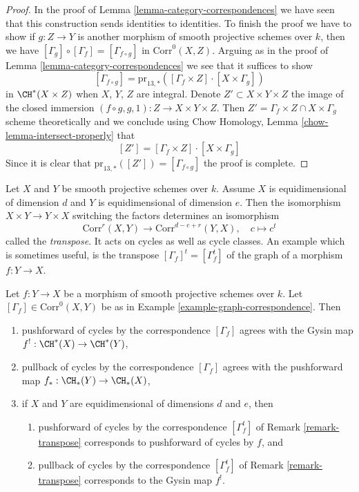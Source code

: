 \begin{proof}
In the proof of Lemma \ref{lemma-category-correspondences}
we have seen that this construction sends identities to
identities. To finish the proof we have to show if $g : Z \to Y$
is another morphism of smooth projective schemes over $k$, then we have
$[\Gamma_g] \circ [\Gamma_f] = [\Gamma_{f \circ g}]$ in
$\text{Corr}^0(X, Z)$. Arguing as in the proof of
Lemma \ref{lemma-category-correspondences} we see that it
suffices to show
$$
[\Gamma_{f \circ g}] =
\text{pr}_{13, *}([\Gamma_f \times Z] \cdot [X \times \Gamma_g])
$$
in $\CH^*(X \times Z)$ when $X$, $Y$, $Z$ are integral.
Denote $Z' \subset X \times Y \times Z$ the image of the closed immersion
$(f \circ g, g, 1) : Z \to X \times Y \times Z$.
Then $Z' = \Gamma_f \times Z \cap X \times \Gamma_g$
scheme theoretically and we conclude using
Chow Homology, Lemma \ref{chow-lemma-intersect-properly}
that
$$
[Z'] = [\Gamma_f \times Z] \cdot [X \times \Gamma_g]
$$
Since it is clear that $\text{pr}_{13, *}([Z']) = [\Gamma_{f \circ g}]$
the proof is complete.
\end{proof}

\begin{remark}
\label{remark-transpose}
Let $X$ and $Y$ be smooth projective schemes over $k$.
Assume $X$ is equidimensional of dimension $d$ and
$Y$ is equidimensional of dimension $e$. Then the isomorphism
$X \times Y \to Y \times X$ switching the factors determines
an isomorphism
$$
\text{Corr}^r(X, Y) \longrightarrow \text{Corr}^{d - e + r}(Y, X),\quad
c \longmapsto c^t
$$
called the {\it transpose}. It acts on cycles as well as cycle classes.
An example which is sometimes useful, is the transpose
$[\Gamma_f]^t = [\Gamma_f^t]$ of the graph of a morphism $f : Y \to X$.
\end{remark}

\begin{lemma}
\label{lemma-functor-and-cycles}
Let $f : Y \to X$ be a morphism of smooth projective schemes over $k$.
Let $[\Gamma_f] \in \text{Corr}^0(X, Y)$ be as in
Example \ref{example-graph-correspondence}. Then
\begin{enumerate}
\item pushforward of cycles by the correspondence $[\Gamma_f]$
agrees with the Gysin map $f^! : \CH^*(X) \to \CH^*(Y)$,
\item pullback of cycles by the correspondence $[\Gamma_f]$
agrees with the pushforward map $f_* : \CH_*(Y) \to \CH_*(X)$,
\item if $X$ and $Y$ are equidimensional of dimensions $d$ and $e$,
then
\begin{enumerate}
\item pushforward of cycles by the correspondence
$[\Gamma_f^t]$ of Remark \ref{remark-transpose}
corresponds to pushforward of cycles by $f$, and
\item pullback of cycles by the correspondence
$[\Gamma_f^t]$ of Remark \ref{remark-transpose}
corresponds to the Gysin map $f^!$.
\end{enumerate}
\end{enumerate}
\end{lemma}

